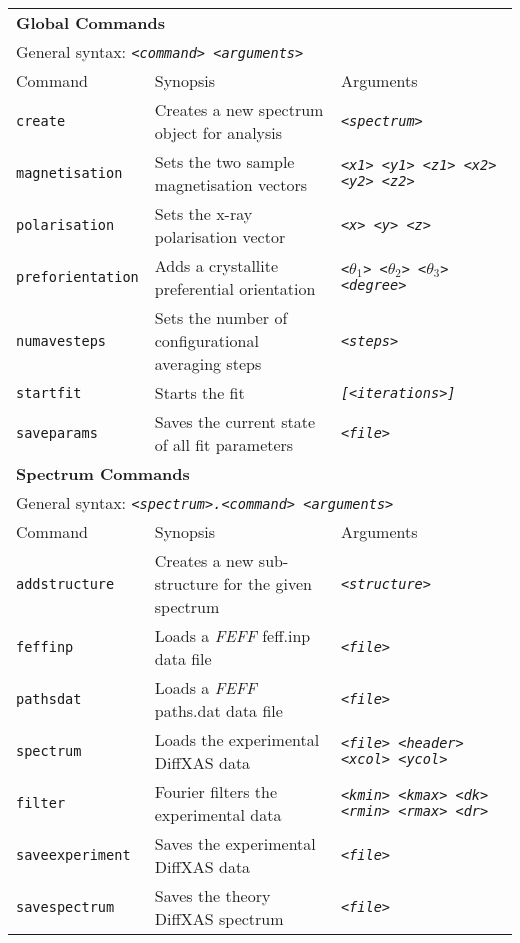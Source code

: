 \documentclass[a4paper,12pt]{report}
\newcommand{\feff}{\emph{FEFF} }
\begin{document}
\newpage
\begin{sidewaystable}
\begin{tabular}{|l|l|l|}
\hline
\multicolumn{3}{|l|}{\bf Global Commands} \\
\multicolumn{3}{|l|}{General syntax: \emph{\texttt{<command> <arguments>}}} \\
\hline
Command & Synopsis & Arguments \\
\hline
\verb|create| & Creates a new spectrum object for analysis & \emph{\texttt{<spectrum>}} \\
\verb|magnetisation| & Sets the two sample magnetisation vectors & \emph{\texttt{<x1> <y1> <z1> <x2> <y2> <z2>}} \\
\verb|polarisation| & Sets the x-ray polarisation vector & \texttt{\emph{<x> <y> <z>}} \\
\verb|preforientation| & Adds a crystallite preferential orientation & \texttt{\emph{<$\theta_1$> <$\theta_2$> <$\theta_3$> <degree>}} \\
\verb|numavesteps| & Sets the number of configurational averaging steps & \texttt{\emph{<steps>}} \\
\verb|startfit| & Starts the fit & \texttt{\emph{[<iterations>]}} \\
\verb|saveparams| & Saves the current state of all fit parameters & \texttt{\emph{<file>}} \\
\hline
\hline
\multicolumn{3}{|l|}{\bf Spectrum Commands} \\
\multicolumn{3}{|l|}{General syntax: \emph{\texttt{<spectrum>.<command> <arguments>}}} \\
\hline
Command & Synopsis & Arguments \\
\hline
\verb|addstructure| & Creates a new sub-structure for the given spectrum & \emph{\texttt{<structure>}} \\
\verb|feffinp| & Loads a \feff feff.inp data file & \emph{\texttt{<file>}} \\
\verb|pathsdat| & Loads a \feff paths.dat data file & \emph{\texttt{<file>}} \\
\verb|spectrum| & Loads the experimental DiffXAS data & \texttt{\emph{<file> <header> <xcol> <ycol>}} \\
\verb|filter| & Fourier filters the experimental data & \texttt{\emph{<kmin> <kmax> <dk> <rmin> <rmax> <dr>}} \\
\verb|saveexperiment| & Saves the experimental DiffXAS data & \emph{\texttt{<file>}} \\
\verb|savespectrum| & Saves the theory DiffXAS spectrum & \emph{\texttt{<file>}} \\

\end{tabular}
\end{sidewaystable}
\end{document}
